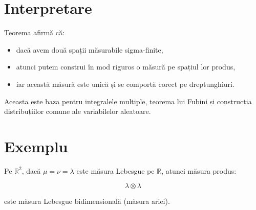 \documentclass[12pt]{article}
\theoremstyle{plain}
\begin{document}
\section{Interpretare}

Teorema afirmă că:

\begin{itemize}
    \item dacă avem două spații măsurabile sigma-finite,
    \item atunci putem construi în mod riguros o măsură pe spațiul lor produs,
    \item iar această măsură este unică și se comportă corect pe dreptunghiuri.
\end{itemize}

Aceasta este baza pentru integralele multiple, teorema lui Fubini și
construcția distribuțiilor comune ale variabilelor aleatoare.

\section{Exemplu}

Pe $\mathbb{R}^2$, dacă $\mu = \nu = \lambda$ este măsura Lebesgue pe
$\mathbb{R}$, atunci măsura produs:



\[
\lambda \otimes \lambda
\]



este măsura Lebesgue bidimensională (măsura ariei).
\end{document}
